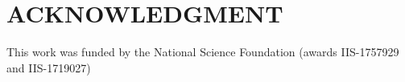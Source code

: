 \documentclass[letterpaper, 10 pt, conference]{ieeeconf}  %
\begin{document}
%



%

\section*{ACKNOWLEDGMENT}
This work was funded by the National Science Foundation (awards IIS-1757929 and IIS-1719027)


\end{document}
